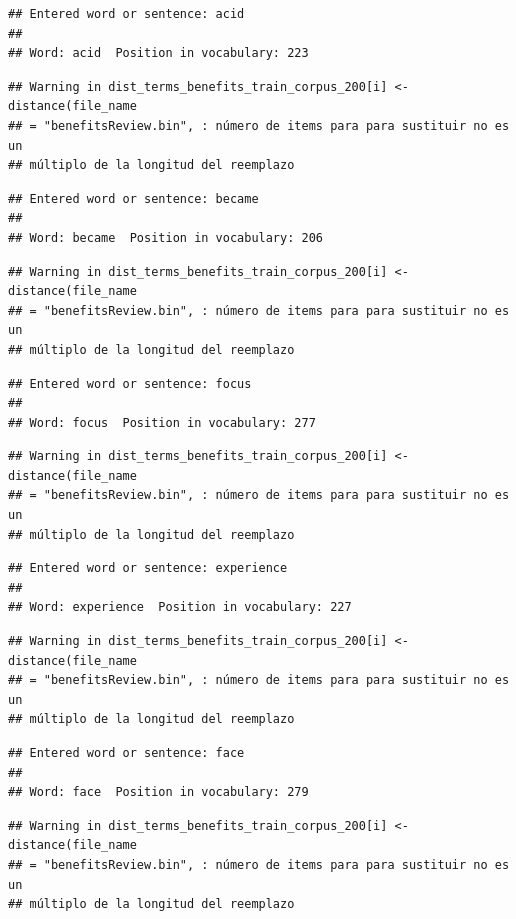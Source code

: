 \documentclass[spanish,]{article}
\begin{document}
\begin{verbatim}
## Entered word or sentence: acid
## 
## Word: acid  Position in vocabulary: 223
\end{verbatim}

\begin{verbatim}
## Warning in dist_terms_benefits_train_corpus_200[i] <- distance(file_name
## = "benefitsReview.bin", : número de items para para sustituir no es un
## múltiplo de la longitud del reemplazo
\end{verbatim}

\begin{verbatim}
## Entered word or sentence: became
## 
## Word: became  Position in vocabulary: 206
\end{verbatim}

\begin{verbatim}
## Warning in dist_terms_benefits_train_corpus_200[i] <- distance(file_name
## = "benefitsReview.bin", : número de items para para sustituir no es un
## múltiplo de la longitud del reemplazo
\end{verbatim}

\begin{verbatim}
## Entered word or sentence: focus
## 
## Word: focus  Position in vocabulary: 277
\end{verbatim}

\begin{verbatim}
## Warning in dist_terms_benefits_train_corpus_200[i] <- distance(file_name
## = "benefitsReview.bin", : número de items para para sustituir no es un
## múltiplo de la longitud del reemplazo
\end{verbatim}

\begin{verbatim}
## Entered word or sentence: experience
## 
## Word: experience  Position in vocabulary: 227
\end{verbatim}

\begin{verbatim}
## Warning in dist_terms_benefits_train_corpus_200[i] <- distance(file_name
## = "benefitsReview.bin", : número de items para para sustituir no es un
## múltiplo de la longitud del reemplazo
\end{verbatim}

\begin{verbatim}
## Entered word or sentence: face
## 
## Word: face  Position in vocabulary: 279
\end{verbatim}

\begin{verbatim}
## Warning in dist_terms_benefits_train_corpus_200[i] <- distance(file_name
## = "benefitsReview.bin", : número de items para para sustituir no es un
## múltiplo de la longitud del reemplazo
\end{verbatim}
\end{document}
